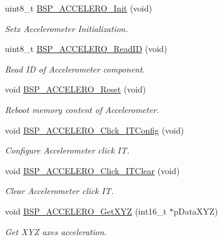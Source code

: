 \begin{DoxyCompactItemize}
\item 
uint8\-\_\-t \hyperlink{group__STM32F4__DISCOVERY__ACCELEROMETER__Private__Functions_gabf4ff11d52225c76c7bb74594a997b70}{B\-S\-P\-\_\-\-A\-C\-C\-E\-L\-E\-R\-O\-\_\-\-Init} (void)
\begin{DoxyCompactList}\small\item\em Setx Accelerometer Initialization. \end{DoxyCompactList}\item 
uint8\-\_\-t \hyperlink{group__STM32F4__DISCOVERY__ACCELEROMETER__Private__Functions_ga9b2ab6f278a3e4aaa8c4546b60f0d9c7}{B\-S\-P\-\_\-\-A\-C\-C\-E\-L\-E\-R\-O\-\_\-\-Read\-I\-D} (void)
\begin{DoxyCompactList}\small\item\em Read I\-D of Accelerometer component. \end{DoxyCompactList}\item 
void \hyperlink{group__STM32F4__DISCOVERY__ACCELEROMETER__Private__Functions_gad90c6bf7f497dd8797723dfea3f3a799}{B\-S\-P\-\_\-\-A\-C\-C\-E\-L\-E\-R\-O\-\_\-\-Reset} (void)
\begin{DoxyCompactList}\small\item\em Reboot memory content of Accelerometer. \end{DoxyCompactList}\item 
void \hyperlink{group__STM32F4__DISCOVERY__ACCELEROMETER__Private__Functions_ga4515f243e07223c1a2d2e3cb4925c206}{B\-S\-P\-\_\-\-A\-C\-C\-E\-L\-E\-R\-O\-\_\-\-Click\-\_\-\-I\-T\-Config} (void)
\begin{DoxyCompactList}\small\item\em Configure Accelerometer click I\-T. \end{DoxyCompactList}\item 
void \hyperlink{group__STM32F4__DISCOVERY__ACCELEROMETER__Private__Functions_ga0e8c8fcc9b740fcbd740f245bffe038e}{B\-S\-P\-\_\-\-A\-C\-C\-E\-L\-E\-R\-O\-\_\-\-Click\-\_\-\-I\-T\-Clear} (void)
\begin{DoxyCompactList}\small\item\em Clear Accelerometer click I\-T. \end{DoxyCompactList}\item 
void \hyperlink{group__STM32F4__DISCOVERY__ACCELEROMETER__Private__Functions_ga8d6fc59af2002a207d1c2b30e942af42}{B\-S\-P\-\_\-\-A\-C\-C\-E\-L\-E\-R\-O\-\_\-\-Get\-X\-Y\-Z} (int16\-\_\-t $\ast$p\-Data\-X\-Y\-Z)
\begin{DoxyCompactList}\small\item\em Get X\-Y\-Z axes acceleration. \end{DoxyCompactList}\end{DoxyCompactItemize}


